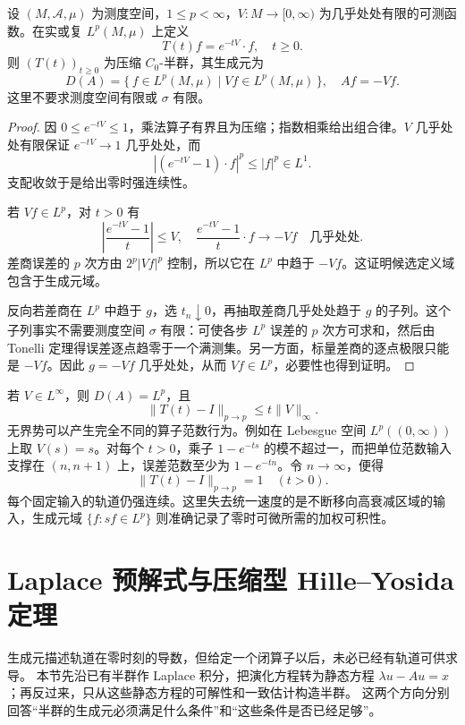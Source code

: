 \begin{proposition}[非负乘法模型]\label{b2:prop:D-multiplication-generator}
设 \((M,\mathcal A,\mu)\) 为测度空间，\(1\leq p<\infty\)，\(V:M\to[0,\infty)\) 为几乎处处有限的可测函数。在实或复 \(L^p(M,\mu)\) 上定义
\[
 T(t)f=e^{-tV}\cdot f,\quad t\geq0.
\]
则 \((T(t))_{t\geq0}\) 为压缩 \(C_0\)-半群，其生成元为
\[
 D(A)=\{\,f\in L^p(M,\mu)\mid Vf\in L^p(M,\mu)\,\},
 \quad Af=-Vf.
\]
这里不要求测度空间有限或 \(\sigma\) 有限。
\end{proposition}
\begin{proof}
因 \(0\leq e^{-tV}\leq1\)，乘法算子有界且为压缩；指数相乘给出组合律。\(V\) 几乎处处有限保证 \(e^{-tV}\to1\) 几乎处处，而
\[
 |(e^{-tV}-1)\cdot f|^p\leq |f|^p\in L^1.
\]
支配收敛于是给出零时强连续性。

若 \(Vf\in L^p\)，对 \(t>0\) 有
\[
 \left|\frac{e^{-tV}-1}{t}\right|\leq V,\quad
 \frac{e^{-tV}-1}{t}\cdot f\longrightarrow -Vf
 \quad\text{几乎处处}.
\]
差商误差的 \(p\) 次方由 \(2^p|Vf|^p\) 控制，所以它在 \(L^p\) 中趋于 \(-Vf\)。这证明候选定义域包含于生成元域。

反向若差商在 \(L^p\) 中趋于 \(g\)，选 \(t_n\downarrow0\)，再抽取差商几乎处处趋于 \(g\) 的子列。这个子列事实不需要测度空间 \(\sigma\) 有限：可使各步 \(L^p\) 误差的 \(p\) 次方可求和，然后由 Tonelli 定理得误差逐点趋零于一个满测集。另一方面，标量差商的逐点极限只能是 \(-Vf\)。因此 \(g=-Vf\) 几乎处处，从而 \(Vf\in L^p\)，必要性也得到证明。
\end{proof}
若 \(V\in L^\infty\)，则 \(D(A)=L^p\)，且
\[
 \|T(t)-I\|_{p\to p}\leq t\|V\|_\infty.
\]
无界势可以产生完全不同的算子范数行为。例如在 Lebesgue 空间 \(L^p((0,\infty))\) 上取 \(V(s)=s\)。对每个 \(t>0\)，乘子 \(1-e^{-ts}\) 的模不超过一，而把单位范数输入支撑在 \((n,n+1)\) 上，误差范数至少为 \(1-e^{-tn}\)。令 \(n\to\infty\)，便得
\[
 \|T(t)-I\|_{p\to p}=1\quad(t>0).
\]
每个固定输入的轨道仍强连续。这里失去统一速度的是不断移向高衰减区域的输入，生成元域 \(\{f:sf\in L^p\}\) 则准确记录了零时可微所需的加权可积性。

\section{Laplace 预解式与压缩型 Hille–Yosida 定理}

\label{b2:sec:app-D-3}

生成元描述轨道在零时刻的导数，但给定一个闭算子以后，未必已经有轨道可供求导。
本节先沿已有半群作 Laplace 积分，把演化方程转为静态方程
\(\lambda u-Au=x\)；再反过来，只从这些静态方程的可解性和一致估计构造半群。
这两个方向分别回答“半群的生成元必须满足什么条件”和“这些条件是否已经足够”。

